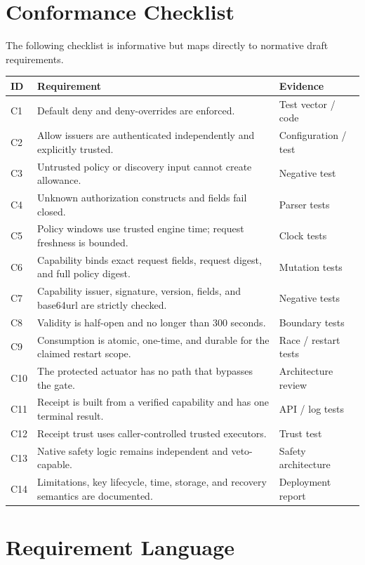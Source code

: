 \documentclass[10.5pt,a4paper]{article}
\begin{document}
\appendix
\section{Conformance Checklist}

The following checklist is informative but maps directly to normative draft requirements.

\begin{longtable}{@{}p{7mm}p{113mm}p{28mm}@{}}
\toprule
\textbf{ID} & \textbf{Requirement} & \textbf{Evidence} \\
\midrule
\endhead
C1 & Default deny and deny-overrides are enforced. & Test vector / code \\
C2 & Allow issuers are authenticated independently and explicitly trusted. & Configuration / test \\
C3 & Untrusted policy or discovery input cannot create allowance. & Negative test \\
C4 & Unknown authorization constructs and fields fail closed. & Parser tests \\
C5 & Policy windows use trusted engine time; request freshness is bounded. & Clock tests \\
C6 & Capability binds exact request fields, request digest, and full policy digest. & Mutation tests \\
C7 & Capability issuer, signature, version, fields, and base64url are strictly checked. & Negative tests \\
C8 & Validity is half-open and no longer than 300 seconds. & Boundary tests \\
C9 & Consumption is atomic, one-time, and durable for the claimed restart scope. & Race / restart tests \\
C10 & The protected actuator has no path that bypasses the gate. & Architecture review \\
C11 & Receipt is built from a verified capability and has one terminal result. & API / log tests \\
C12 & Receipt trust uses caller-controlled trusted executors. & Trust test \\
C13 & Native safety logic remains independent and veto-capable. & Safety architecture \\
C14 & Limitations, key lifecycle, time, storage, and recovery semantics are documented. & Deployment report \\
\bottomrule
\end{longtable}

\section{Requirement Language}
\end{document}
